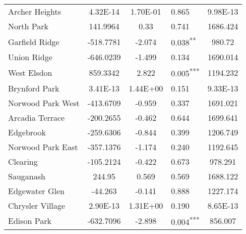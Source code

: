 \documentclass[12pt]{report}
\begin{document}
\begin{longtable}{l S[table-format=6.4] S[table-format=3.4] l S[table-format=4.4]}
	Archer Heights               & 4.32E-14             & 1.70E-01         & 0.865                      & 9.98E-13                          \\
	North Park                   & 141.9964             & 0.33             & 0.741                      & 1686.424                          \\
	Garfield Ridge               & -518.7781            & -2.074           & 0.038\textsuperscript{**}  & 980.72                            \\
	Union Ridge                  & -646.0239            & -1.499           & 0.134                      & 1690.014                          \\
	West Elsdon                  & 859.3342             & 2.822            & 0.005\textsuperscript{***} & 1194.232                          \\
	Brynford Park                & 3.41E-13             & 1.44E+00         & 0.151                      & 9.33E-13                          \\
	Norwood Park West            & -413.6709            & -0.959           & 0.337                      & 1691.021                          \\
	Arcadia Terrace              & -200.2655            & -0.462           & 0.644                      & 1699.641                          \\
	Edgebrook                    & -259.6306            & -0.844           & 0.399                      & 1206.749                          \\
	Norwood Park East            & -357.1376            & -1.174           & 0.240                      & 1192.645                          \\
	Clearing                     & -105.2124            & -0.422           & 0.673                      & 978.291                           \\
	Sauganash                    & 244.95               & 0.569            & 0.569                      & 1688.122                          \\
	Edgewater Glen               & -44.263              & -0.141           & 0.888                      & 1227.174                          \\
	Chrysler Village             & 2.90E-13             & 1.31E+00         & 0.190                      & 8.65E-13                          \\
	Edison Park                  & -632.7096            & -2.898           & 0.004\textsuperscript{***} & 856.007                           \\

\end{longtable}
\end{document}
